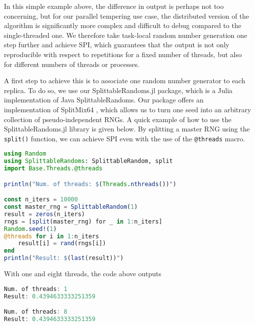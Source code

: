 In this simple example above, the difference in output is perhaps not too concerning, 
but for our parallel tempering 
use case, the distributed version of the algorithm is significantly more complex 
and difficult to debug compared to the single-threaded one. We therefore take task-local 
random number generation one step further and achieve SPI, which 
guarantees that the output is not only reproducible with respect to repetitions 
for a fixed number of threads, but also for different numbers of threads or processes.

 
A first step to achieve this is to associate one random number 
generator to each replica. 
To do so, we use our SplittableRandoms.jl package, which is a Julia implementation 
of Java SplittableRandoms. Our package offers an implementation of  
SplitMix64 \cite{steele2014fast},
which allows us to turn one seed into an arbitrary collection of pseudo-independent 
RNGs. 
A quick example of how to use the SplittableRandoms.jl library is given below. 
By splitting a master RNG using the \texttt{split()} function, 
we can achieve SPI even with the use of the \texttt{@threads} macro. 

\begin{lstlisting}[language = Julia]
using Random
using SplittableRandoms: SplittableRandom, split
import Base.Threads.@threads

println("Num. of threads: $(Threads.nthreads())")

const n_iters = 10000
const master_rng = SplittableRandom(1)
result = zeros(n_iters)
rngs = [split(master_rng) for _ in 1:n_iters]
Random.seed!(1)
@threads for i in 1:n_iters
    result[i] = rand(rngs[i])
end
println("Result: $(last(result))")
\end{lstlisting}
With one and eight threads, the code above outputs
\begin{minipage}{\linewidth}
\begin{lstlisting}[language = Julia]
Num. of threads: 1
Result: 0.4394633333251359

Num. of threads: 8
Result: 0.4394633333251359
\end{lstlisting}
\end{minipage}
